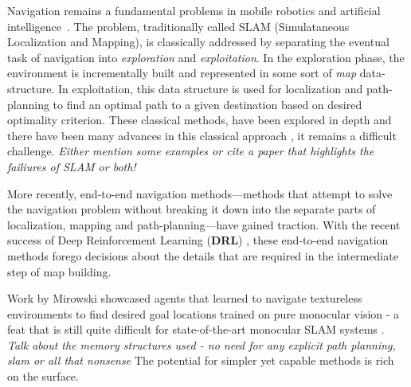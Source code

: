 
Navigation remains a fundamental problems in mobile robotics and artificial intelligence~\cite{SmChIJRR1986,ElCOMPUTER1980}.
The problem, traditionally called SLAM (Simulataneous Localization and Mapping), is classically addressed by separating the eventual task of navigation into \textit{exploration} and \textit{exploitation}. In the exploration phase, the environment is incrementally built and represented in some sort of \emph{map} data-structure. In exploitation, this data structure is used for localization and path-planning to find an optimal path to a given destination based on desired optimality criterion. These classical methods, have been explored in depth and  there have been many advances in this classical approach \cite{XXX}, it remains a difficult challenge. \textit{Either mention some examples or cite a paper that highlights the failiures of SLAM or both!} 

%
More recently, end-to-end navigation methods---methods that attempt to  
solve the navigation problem without breaking it down into the separate parts of localization, mapping and path-planning---have gained traction.
With the recent success of Deep Reinforcement Learning (\textbf{DRL}) \cite{MnKaSiNATURE2015,MnKaSiNATURE2015}, these end-to-end navigation methods \cite{MnBaMiICML2016,SiHuMaNATURE2016,LePaKrISER2017,MiPaViICLR2017,OhChSiICML2016} forego decisions about the details that are required in the intermediate step of map building.  

Work by Mirowski \etal{} showcased agents that learned to navigate textureless environments to find desired goal locations trained on pure monocular vision - a feat that is still quite difficult for state-of-the-art monocular SLAM systems \cite{XXX}. \textit{Talk about the memory structures used - no need for any explicit path planning, slam or all that nonsense} 
The potential for simpler yet capable methods is rich on the surface.

